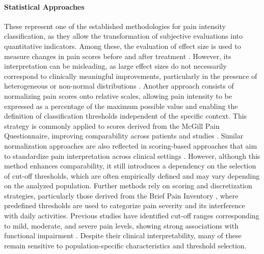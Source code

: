 \documentclass[preprint,12pt,authoryear]{elsarticle}
\begin{document}
\paragraph{Statistical Approaches}  These represent one of the established methodologies for pain intensity classification, as they allow the transformation of subjective evaluations into quantitative indicators. Among these, the evaluation of effect size is used to measure changes in pain scores before and after treatment \citep{cohen2013statistical}. However, its interpretation can be misleading, as large effect sizes do not necessarily correspond to clinically meaningful improvements, particularly in the presence of heterogeneous or non-normal distributions \citep{bogduk2022calibrating}. Another approach consists of normalizing pain scores onto relative scales, allowing pain intensity to be expressed as a percentage of the maximum possible value and enabling the definition of classification thresholds independent of the specific context. This strategy is commonly applied to scores derived from the McGill Pain Questionnaire, improving comparability across patients and studies \citep{melzack1996pain, melzack2005mcgill}. Similar normalization approaches are also reflected in scoring-based approaches that aim to standardize pain interpretation across clinical settings \citep{serlin1995cancer,cleeland1994pain,napoletano2025can}. However, although this method enhances comparability, it still introduces a dependency on the selection of cut-off thresholds, which are often empirically defined and may vary depending on the analyzed population. Further methods rely on scoring and discretization strategies, particularly those derived from the Brief Pain Inventory \citep{cleeland1994pain}, where predefined thresholds are used to categorize pain severity and its interference with daily activities. Previous studies have identified cut-off ranges corresponding to mild, moderate, and severe pain levels, showing strong associations with functional impairment \citep{katz2011mcgill, chow2016revisiting}. Despite their clinical interpretability, many of these remain sensitive to population-specific characteristics and threshold selection.
\end{document}
